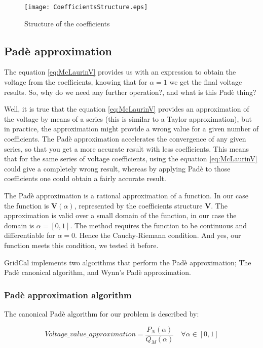 \documentclass[11pt,fleqn]{book} %
\begin{document}
\begin{figure}[h]
	\centering
	\texttt{[image: CoefficientsStructure.eps]}
	\caption{Structure of the coefficients}
	\label{fig:CoefficientsStructure}
\end{figure}

\subsection{Padè approximation}

The equation \ref{eq:McLaurinV} provides us with an expression to obtain the voltage from the coefficients, knowing that for $\alpha=1$ we get the final voltage results. So, why do we need any further operation?, and what is this Padè thing?

Well, it is true that the equation \ref{eq:McLaurinV} provides an approximation of the voltage by means of a series (this is similar to a Taylor approximation), but in practice, the approximation might provide a wrong value for a given number of coefficients. The Padè approximation accelerates the convergence of any given series, so that you get a more accurate result with less coefficients. This means that for the same series of voltage coefficients, using the equation \ref{eq:McLaurinV} could give a completely wrong result, whereas by applying Padè to those coefficients one could obtain a fairly accurate result.

The Padè approximation is a rational approximation of a function. In our case the function is $\textbf{V}(\alpha)$, represented by the coefficients structure $\textbf{V}$. The approximation is valid over a small domain of the function, in our case the domain is $\alpha=[0,1]$. The method requires the function to be continuous and differentiable for $\alpha=0$. Hence the Cauchy-Riemann condition. And yes, our function meets this condition, we tested it before.

GridCal implements two algorithms that perform the Padè approximation; The Padè canonical algorithm, and Wynn's Padè approximation.

\subsubsection{Padè approximation algorithm}

The canonical Padè algorithm for our problem is described by:

\begin{equation}
Voltage\_value\_approximation = \frac{P_N(\alpha)}{Q_M(\alpha)} \quad \forall \alpha \in [0,1]
\label{eq:pade_apprx}
\end{equation}
\end{document}
